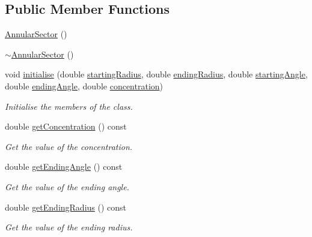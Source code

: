 \subsection*{Public Member Functions}
\begin{DoxyCompactItemize}
\item 
\hyperlink{classmultiscale_1_1video_1_1AnnularSector_a96ea49d6d05346ef9ae99289945eb578}{Annular\-Sector} ()
\item 
\hyperlink{classmultiscale_1_1video_1_1AnnularSector_a2ced14f6af200e6e4c1c5f3e189bde4b}{$\sim$\-Annular\-Sector} ()
\item 
void \hyperlink{classmultiscale_1_1video_1_1AnnularSector_a58217c07c5c28c33f541fc37d429d79b}{initialise} (double \hyperlink{classmultiscale_1_1video_1_1AnnularSector_a4c0094d8993edb40b15580fa58a8a393}{starting\-Radius}, double \hyperlink{classmultiscale_1_1video_1_1AnnularSector_aa45c5399240707d0b3fc02ee86b97c79}{ending\-Radius}, double \hyperlink{classmultiscale_1_1video_1_1AnnularSector_a437d3dc1b2fadace28bdc3d26a78c0b3}{starting\-Angle}, double \hyperlink{classmultiscale_1_1video_1_1AnnularSector_a0aebd11072dbefe42196d6bda2e4318d}{ending\-Angle}, double \hyperlink{classmultiscale_1_1video_1_1AnnularSector_a7f6a1e7618c9e2a10e35efb5740395b1}{concentration})
\begin{DoxyCompactList}\small\item\em Initialise the members of the class. \end{DoxyCompactList}\item 
double \hyperlink{classmultiscale_1_1video_1_1AnnularSector_aee1181ae47b33a40fb2103149e45e7f1}{get\-Concentration} () const 
\begin{DoxyCompactList}\small\item\em Get the value of the concentration. \end{DoxyCompactList}\item 
double \hyperlink{classmultiscale_1_1video_1_1AnnularSector_acc074c86ca7e06ac8d5873a200498dce}{get\-Ending\-Angle} () const 
\begin{DoxyCompactList}\small\item\em Get the value of the ending angle. \end{DoxyCompactList}\item 
double \hyperlink{classmultiscale_1_1video_1_1AnnularSector_acf9600073991cf0448ab2b2997ed4513}{get\-Ending\-Radius} () const 
\begin{DoxyCompactList}\small\item\em Get the value of the ending radius. \end{DoxyCompactList}\item 

\end{DoxyCompactItemize}
